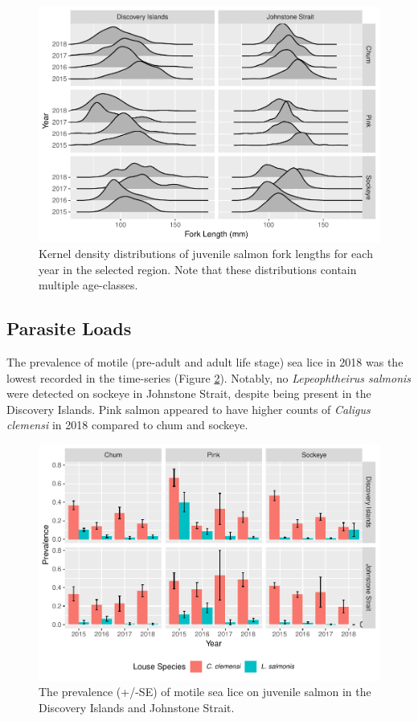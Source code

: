 \documentclass[fleqn,10pt]{wlpeerj} %
\begin{document}
\begin{figure}[H]
\includegraphics[width=0.8\linewidth]{peer_j_migration_dynamics_files/figure-latex/length-1} \caption{Kernel density distributions of juvenile salmon fork lengths for each year in the selected region. Note that these distributions contain multiple age-classes.}\label{fig:length}
\end{figure}

\subsection*{Parasite Loads}\label{parasite-loads}

The prevalence of motile (pre-adult and adult life stage) sea lice in
2018 was the lowest recorded in the time-series (Figure
\ref{fig:sealice}). Notably, no \emph{Lepeophtheirus salmonis} were
detected on sockeye in Johnstone Strait, despite being present in the
Discovery Islands. Pink salmon appeared to have higher counts of
\emph{Caligus clemensi} in 2018 compared to chum and sockeye.

\begin{figure}[H]
\includegraphics[width=0.8\linewidth]{peer_j_migration_dynamics_files/figure-latex/sealice-1} \caption{The prevalence (+/-SE) of motile sea lice on juvenile salmon in the Discovery Islands and Johnstone Strait.}\label{fig:sealice}
\end{figure}
\end{document}
